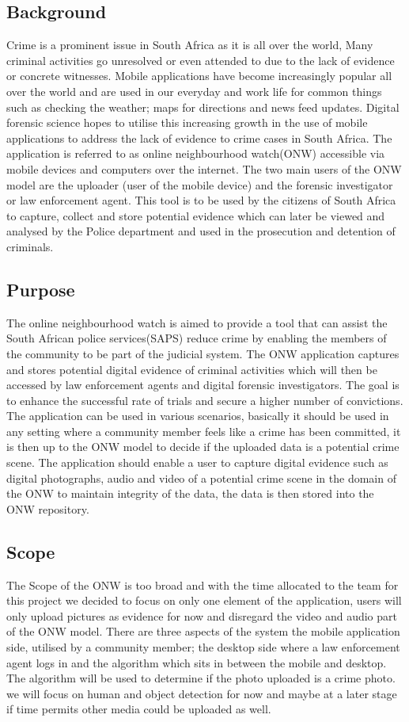 \documentclass[a4paper,12pt]{article}
\begin{document}
\subsection{Background}
Crime is a prominent issue in South Africa as it is all over the world, Many criminal activities go unresolved or even attended to due to the lack of evidence or concrete witnesses.  Mobile applications have become increasingly popular all over the world and are used in our everyday and work life for common things such as checking the weather; maps for directions and news feed updates.  Digital forensic science hopes to utilise this increasing growth in the use of mobile applications to address the lack of evidence to crime cases in South Africa.
The application is referred to as online neighbourhood watch(ONW) accessible via mobile devices and computers over the internet.  The two main users of the ONW model are the uploader (user of the mobile device) and the forensic investigator or law enforcement agent. 
This tool is to be used by the citizens of South Africa to capture, collect and store potential evidence which can later be viewed and analysed by the Police department and used in the prosecution and detention of criminals.
\subsection{Purpose}
The online neighbourhood watch is aimed to provide a tool that can assist the South African police services(SAPS) reduce crime by enabling the members of the community to be part of the judicial system.  The ONW application captures and stores potential digital evidence of criminal activities which will then be accessed by law enforcement agents and digital forensic investigators.  The goal is to enhance the successful rate of trials and secure a higher number of convictions.
The application can be used in various scenarios, basically it should be used in any setting where a community member feels like a crime has been committed, it is then up to the ONW model to decide if the uploaded data is a potential crime scene. The application should enable a user to capture digital evidence such as digital photographs, audio and video of a potential crime scene in the domain of the ONW to maintain integrity of the data, the data is then stored into the ONW repository.
\subsection{Scope}
The Scope of the ONW is too broad and with the time allocated to the team for this project we decided to focus on only one element of the application, users will only upload pictures as evidence for now and disregard the video and audio part of the ONW model.  There are three aspects of the system the mobile application side, utilised by a community member; the desktop side where a law enforcement agent logs in and the algorithm which sits in between the mobile and desktop.  The algorithm will be used to determine if the photo uploaded is a crime photo. we will focus on human and object detection for now and maybe at a later stage if time permits other media could be uploaded as well. 
\end{document}
